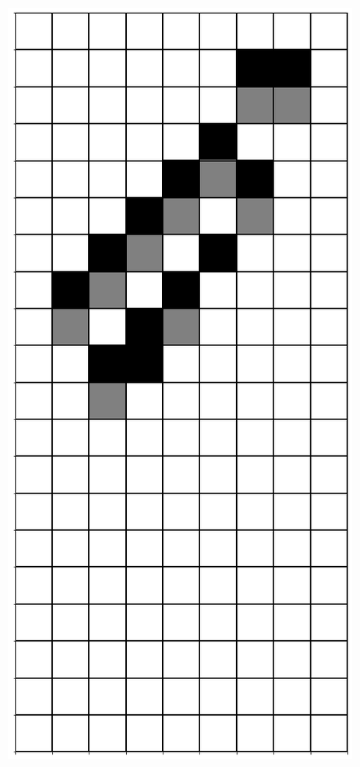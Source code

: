 \documentclass[12pt]{article}
\numberwithin{figure}{section} %
\begin{document}
\begin{figure}[H]
\begin{subfigure}{0.3\textwidth}
     \subcaption{}
   \end{subfigure}
        \begin{subfigure}{0.3\textwidth}
     \centering
     \includegraphics[angle=270,width=\linewidth]{Section4/22.8}

\end{subfigure}
\end{figure}
\end{document}
